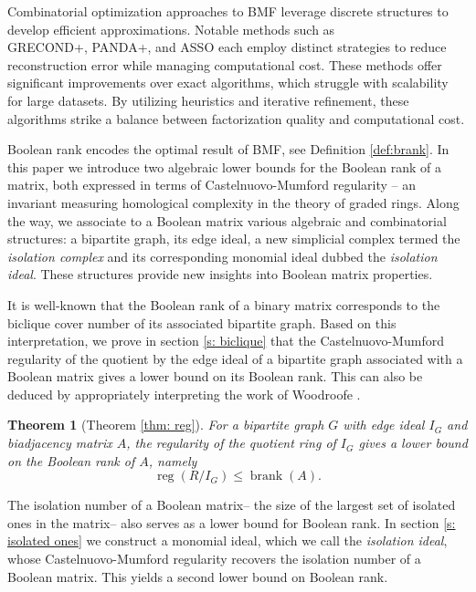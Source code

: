 \documentclass[11pt,letterpaper, reqno]{amsart}
\newtheorem{introthm}{Theorem}[section]
\theoremstyle{definition}
\theoremstyle{remark}
\DeclareMathOperator{\reg}{reg}
\DeclareMathOperator{\brank}{brank}
\numberwithin{equation}{section}
\begin{document}
Combinatorial optimization approaches to BMF leverage discrete structures to develop efficient approximations.  Notable methods such as \\ GRECOND+\cite{BELOHLAVEK}, PANDA+\cite{Lucchese}, and ASSO \cite{Miettinen08} each employ distinct strategies to reduce reconstruction error while managing computational cost. These methods offer significant improvements over exact algorithms, which struggle with scalability for large datasets. By utilizing heuristics and iterative refinement, these algorithms strike a balance between factorization quality and computational cost.

Boolean rank encodes the optimal result of BMF, see Definition \ref{def:brank}. In this paper we introduce two algebraic lower bounds for the Boolean rank of a matrix, both expressed in terms of Castelnuovo-Mumford regularity -- an invariant measuring homological complexity in the theory of graded rings. Along the way, we associate to a Boolean matrix various algebraic and combinatorial structures: a bipartite graph, its edge ideal, a new simplicial complex termed the \textit{isolation complex} and its corresponding monomial ideal dubbed the \textit{isolation ideal}. These structures provide new insights into Boolean matrix properties.


It is well-known that the Boolean rank of a binary matrix corresponds to the biclique cover number of its associated bipartite graph. Based on  this interpretation, we prove  in section \ref{s: biclique} that the Castelnuovo-Mumford regularity of the quotient by the edge ideal of a bipartite graph associated with a Boolean matrix gives a lower bound on its Boolean rank. This can also be deduced by appropriately interpreting the work of Woodroofe \cite{Woodroofe}.

\begin{introthm}[Theorem \ref{thm: reg}]
For a bipartite graph $G$ with edge ideal $I_G$ and biadjacency matrix $A$, the regularity of the quotient ring of $I_G$ gives a lower bound on the Boolean rank of $A$, namely 
\[
\reg(R/I_G)\leq \brank(A).
\]


\end{introthm}

 The isolation number of a Boolean matrix-- the size of the largest set of isolated ones in the matrix-- also serves as a lower bound for Boolean rank. In section \ref{s: isolated ones} we construct a monomial ideal, which we call the \textit{isolation ideal}, whose Castelnuovo-Mumford regularity recovers the isolation number of a Boolean matrix. This yields a second lower bound on Boolean rank.
\end{document}
